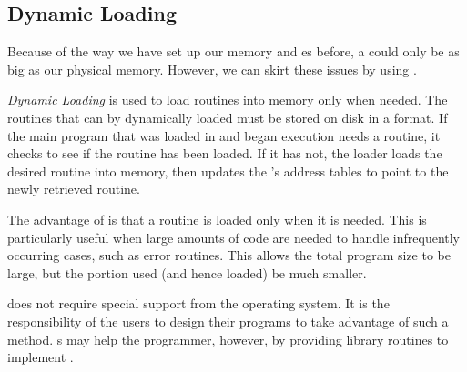 \subsection{Dynamic Loading}\label{subsec:Dynamic_Loading}
Because of the way we have set up our memory and es before, a  could only be as big as our physical memory.
However, we can skirt these issues by using .

\begin{definition}\label{def:Dynamic_Loading}
  \emph{Dynamic Loading} is used to load routines into memory only when needed.
  The routines that can by dynamically loaded must be stored on disk in a  format.
  If the main program that was loaded in and began execution needs a routine, it checks to see if the routine has been loaded.
  If it has not, the loader loads the desired routine into memory, then updates the 's address tables to point to the newly retrieved routine.
\end{definition}

The advantage of  is that a routine is loaded only when it is needed.
This is particularly useful when large amounts of code are needed to handle infrequently occurring cases, such as error routines.
This allows the total program size to be large, but the portion used (and hence loaded) be much smaller.

 does not require special support from the operating system.
It is the responsibility of the users to design their programs to take advantage of such a method.
s may help the programmer, however, by providing library routines to implement .

